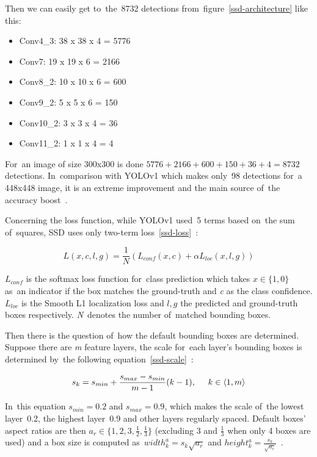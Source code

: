 Then we can easily get to~the~8732 detections from~figure~\ref{ssd-architecture} like this:

\begin{itemize}[topsep=0pt,itemsep=-1.5pt,partopsep=6pt]
    \item Conv4\_3: 38 x 38 x 4 = 5776
    \item Conv7: 19 x 19 x 6 = 2166
    \item Conv8\_2: 10 x 10 x 6 = 600
    \item Conv9\_2: 5 x 5 x 6 = 150
    \item Conv10\_2: 3 x 3 x 4 = 36
    \item Conv11\_2: 1 x 1 x 4 = 4
\end{itemize}

For~an image of size 300x300 is done \(5776 + 2166 + 600 + 150 + 36 + 4 = 8732\) detections. In~comparison with YOLOv1 which makes only~98 detections for~a 448x448 image, it is an extreme improvement and the main source of~the accuracy boost~\cite{ssd-paper}.

Concerning the loss function, while YOLOv1 used~5 terms based on~the sum of~squares, SSD uses only two-term loss~\ref{ssd-loss}~\cite{ssd-paper}:

\begin{equation}
  \label{ssd-loss}
  L(x, c, l, g) = \frac{1}{N}(L_{conf}(x, c) + \alpha L_{loc}(x, l, g))
\end{equation}

\(L_{conf}\) is the softmax loss function for~class prediction which takes \(x \in \{1, 0\}\) as~an indicator if the box matches the ground-truth and \emph{c} as the class confidence. \(L_{loc}\) is the Smooth L1 localization loss and \(l, g\) the predicted and ground-truth boxes respectively. \emph{N}~denotes the number of~matched bounding boxes.

Then there is the question of~how the default bounding boxes are determined. Suppose there are \emph{m} feature layers, the scale for~each layer's bounding boxes is determined by~the following equation~\ref{ssd-scale}~\cite{ssd-paper}:

\begin{equation}
  \label{ssd-scale}
  s_k = s_{min} + \frac{s_{max} - s_{min}}{m - 1} (k - 1), \hspace{0.5cm} k \in \langle1, m\rangle
\end{equation}

In~this equation \(s_{min} = 0.2\) and \(s_{max} = 0.9\), which makes the scale of~the lowest layer~0.2, the highest layer~0.9 and other layers regularly spaced. Default boxes' aspect ratios are then \(a_r \in \{1, 2, 3, \frac{1}{2}, \frac{1}{3}\}\) (excluding 3 and \(\frac{1}{3}\) when only 4 boxes are used) and a box size is computed as~\(width_k^a = s_k \sqrt{a_r}\) and \(height_k^a = \frac{s_k}{\sqrt{a_r}}\)~\cite{ssd-paper}.


